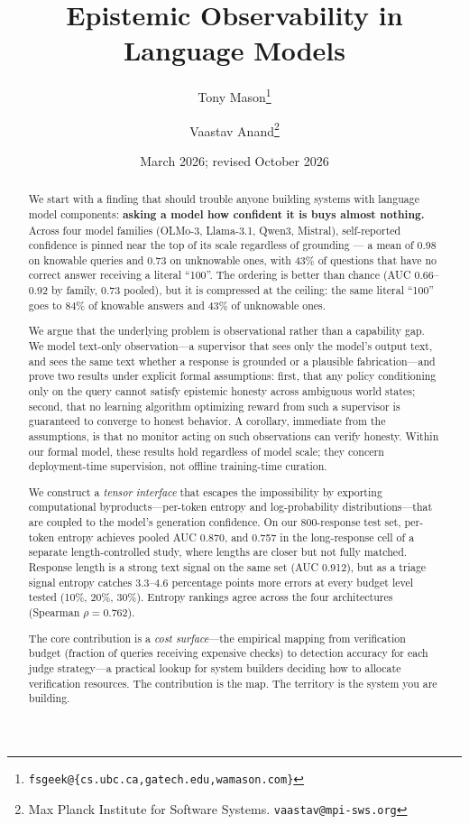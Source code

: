 \documentclass[11pt]{article}
\title{Epistemic Observability in Language Models}
\author{Tony Mason\thanks{\texttt{fsgeek@\{cs.ubc.ca,gatech.edu,wamason.com\}}} \and Vaastav Anand\thanks{Max Planck Institute for Software Systems. \texttt{vaastav@mpi-sws.org}}}
\date{March 2026; revised October 2026}
\begin{document}
\maketitle

\begin{abstract}
We start with a finding that should trouble anyone building systems with
language model components: \textbf{asking a model how confident it is buys
almost nothing.} Across four model families (OLMo-3, Llama-3.1, Qwen3,
Mistral), self-reported confidence is pinned near the top of its scale
regardless of grounding --- a mean of 0.98 on knowable queries and 0.73 on
unknowable ones, with 43\% of questions that have no correct answer receiving a
literal ``100''. The ordering is better than chance (AUC 0.66--0.92 by family,
0.73 pooled), but it is compressed at the ceiling: the same literal ``100'' goes
to 84\% of knowable answers and 43\% of unknowable ones.

We argue that the underlying problem is observational rather than a capability gap. We model
text-only observation---a supervisor that sees only the model's output
text, and sees the same text whether a response is grounded or a plausible
fabrication---and prove two results under explicit formal assumptions: first, that any policy
conditioning only on the query cannot satisfy epistemic honesty across
ambiguous world states; second, that no learning algorithm optimizing reward
from such a supervisor is guaranteed to converge to honest behavior. A
corollary, immediate from the assumptions, is that no monitor acting on such
observations can verify honesty. Within our formal model, these results hold regardless of model scale; they
concern deployment-time supervision, not offline training-time curation.

We construct a \emph{tensor interface} that escapes the impossibility by
exporting computational byproducts---per-token
entropy and log-probability distributions---that are coupled to the model's generation confidence. On our 800-response test set, per-token
entropy achieves pooled AUC 0.870, and 0.757 in the long-response cell of a
separate length-controlled study, where lengths are closer but not fully matched. Response length is a strong text signal on
the same set (AUC 0.912), but as a triage signal entropy catches 3.3--4.6
percentage points more errors at every budget level tested (10\%, 20\%, 30\%).
Entropy rankings agree across the four architectures (Spearman $\rho = 0.762$).

The core contribution is a \emph{cost surface}---the empirical mapping from verification budget (fraction of queries receiving expensive checks) to detection accuracy for each judge strategy---a practical lookup for system builders deciding how to allocate verification resources. The contribution is the map. The
territory is the system you are building.
\end{abstract}
\end{document}
